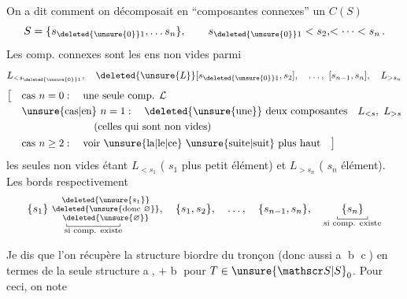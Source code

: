 On a dit comment on décomposait en ``composantes connexes'' un $C(S)$ 
\[
 S=\{s_{\deleted{\unsure{0}}1},\ldots s_n\},\qquad s_{\deleted{\unsure{0}}1}<s_2,\!<\cdots<s_n\,.
\]
Les comp. connexes sont les ens non vides parmi
\[
L_{<s_{\deleted{\unsure{0}}1}},\quad \deleted{\unsure{L}}[s_{\deleted{\unsure{0}}1},s_2],\quad\ldots,\ [s_{n-1},s_n],\quad L_{>s_n}
\]
\[
\begin{aligned}
\bigl[\quad&\text{cas }n=0:\quad\text{une seule comp. }\mathcal L\\
&\text{\unsure{cas|en} }n=1:\quad\deleted{\text{\unsure{une}}}\ \text{deux composantes}\quad L_{<s},\ L_{>s}\\
&\hspace{7em}\text{(celles qui sont non vides)}\\
&\text{cas }n\geq2:\quad\text{voir \unsure{la|le|ce} \unsure{suite|suit} plus haut}\quad\bigr]
\end{aligned}
\]
les seules non vides  étant $L_{<s_1}$ ( $s_1$ plus petit élément) et $L_{>s_n}$ ( $s_n$  élément). Les bords  respectivement
\[
\underset{\substack{\rule{.4pt}{.6ex}\rule{4.8em}{.4pt}\rule{.4pt}{.6ex}\\\text{si comp. existe}}}{\{s_1\}\ \substack{\deleted{\unsure{s_1}}\\\deleted{\unsure{\text{donc }\varnothing}}\\\deleted{\unsure{\varnothing}}}},
\quad\{s_1,s_2\},\quad\ldots,\quad\{s_{n-1},s_n\},\quad
\underset{\substack{\rule{.4pt}{.6ex}\rule{2.7em}{.4pt}\rule{.4pt}{.6ex}\\\text{si comp. existe}}}{\{s_n\}}
\]

Je dis que l'on récupère la structure   biordre du tronçon (donc aussi  \textcircled{a} \textcircled{b} \textcircled{c}) en termes de la seule structure \textcircled{a}, $+$ \textcircled{b} pour $T\in\unsure{\mathscr S|S}_0$.
Pour ceci, on note 

